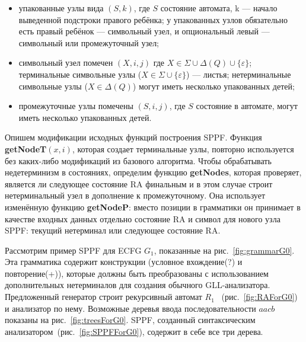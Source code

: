 \documentclass[14pt]{matmex-diploma-custom}
\begin{document}
	\begin{itemize}
		\item упакованные узлы вида $(S, k)$, где $S$ состояние автомата, k --- начало выведенной
		подстроки правого ребёнка; у упакованных узлов обязательно есть правый ребёнок ---
		символьный узел, и опциональный левый --- символьный или промежуточный узел;
		\item символьный узел помечен $(X, i, j)$ где $X \in \Sigma \cup \Delta(Q) \cup \{\varepsilon\}$;
		терминальные символьные узлы ($X \in \Sigma \cup \{\varepsilon\}$) --- листья;
		нетерминальные символьные узлы ($X \in \Delta(Q)$) могут иметь несколько упакованных детей;
		\item промежуточные узлы помечены $ (S, i, j) $, где $S$ состояние в автомате, могут иметь несколько упакованных детей.
	\end{itemize}
	
	Опишем модификации исходных функций построения SPPF.
	Функция \textbf{getNodeT$ (x, i) $}, которая создает терминальные узлы, 
	повторно используется без каких-либо модификаций из базового алгоритма.
	Чтобы обрабатывать недетерминизм в состояниях, определим функцию 
	\textbf{getNodes}, которая проверяет, является ли следующее состояние RA финальным
	и в этом случае строит нетерминальный узел в дополнение к промежуточному.
	Она использует изменённую функцию \textbf{getNodeP}: вместо позиции в грамматики он 
	принимает в качестве входных данных отдельно состояние RA и символ для нового узла SPPF:
	текущий нетерминал или следующее состояние RA.
	
	
	
	
	Рассмотрим пример SPPF для ECFG $ G_1 $, показанные на рис.~\ref{fig:grammarG0}.
	Эта грамматика содержит конструкции (условное вхождение(?) и повторение(+)),
	которые должны быть преобразованы с использованием дополнительных нетерминалов 
	для создания обычного GLL-анализатора.
	Предложенный генератор строит рекурсивный автомат $ R_1 $ ~(рис.~\ref{fig:RAForG0})
	и анализатор по нему. Возможные деревья ввода последовательности $ aacb $ показаны 
	на рис.~\ref{fig:treesForG0}. SPPF, созданный синтаксическим анализатором~(рис.~\ref{fig:SPPFForG0}),
	содержит в себе все три дерева.
	
\end{document}
